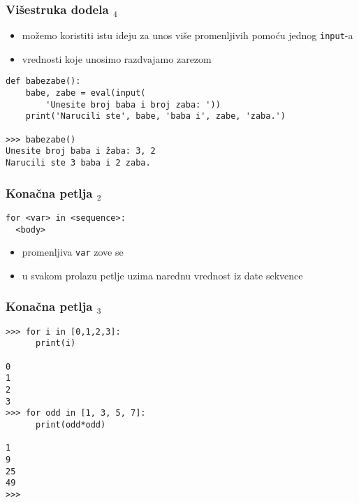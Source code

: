 \documentclass[utf8,compress]{beamer}
\begin{document}
\begin{frame}[fragile]
  \frametitle{Višestruka dodela $_4$}
  \begin{itemize}
    \item možemo koristiti istu ideju za unos više promenljivih pomoću jednog \texttt{input}-a
    \item vrednosti koje unosimo razdvajamo zarezom
  \end{itemize}
\begin{verbatim}
def babezabe():
    babe, zabe = eval(input(
        'Unesite broj baba i broj zaba: '))
    print('Narucili ste', babe, 'baba i', zabe, 'zaba.')

>>> babezabe()
Unesite broj baba i žaba: 3, 2
Narucili ste 3 baba i 2 zaba.
\end{verbatim}
\end{frame}


\begin{frame}[fragile]
  \frametitle{Konačna petlja $_2$}
\begin{verbatim}
for <var> in <sequence>:
  <body>
\end{verbatim}
\begin{itemize}
  \item promenljiva \texttt{var} zove se 
  \item u svakom prolazu petlje uzima narednu vrednost iz date sekvence
\end{itemize}
\end{frame}

\begin{frame}[fragile,shrink=10]
  \frametitle{Konačna petlja $_3$}
\begin{verbatim}
>>> for i in [0,1,2,3]:
      print(i)

0
1
2
3
>>> for odd in [1, 3, 5, 7]:
      print(odd*odd)

1
9
25
49
>>>
\end{verbatim}
\end{frame}
\end{document}
